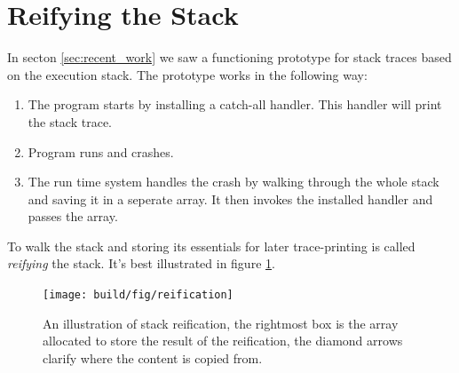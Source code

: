 \section{Reifying the Stack} \label{sec:reifying_the_stack}

In secton \ref{sec:recent_work} we saw a functioning prototype for
stack traces based on the execution stack. The prototype works in the
following way:

\begin{enumerate}
  \item
    The program starts by installing a catch-all handler. This handler will
    print the stack trace.
  \item
    Program runs and crashes.
  \item
    The run time system handles the crash by walking through the whole
    stack and saving it in a seperate array. It then invokes the
    installed handler and passes the array.
\end{enumerate}

To walk the stack and storing its essentials for later trace-printing is
called \emph{reifying} the stack. It's best illustrated in figure \ref{fig:reification}.

\begin{figure}
\begin{mdframed}
  \texttt{[image: build/fig/reification]}
  \caption{An illustration of stack reification, the rightmost box
  is the array allocated to store the result of the reification, the
  diamond arrows clarify where the content is copied from.}
  \label{fig:reification}
\end{mdframed}
\end{figure}



